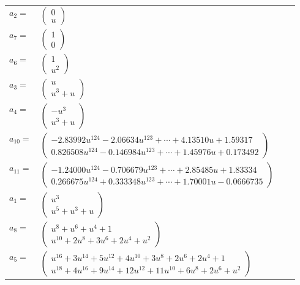 \documentclass[1p]{elsarticle_modified}
\theoremstyle{definition}
\begin{document}
\begin{tabular}{m{7pt} m{180pt} m{7pt} m{180pt} }
\flushright $a_{2}=$&$\begin{pmatrix}0\\u\end{pmatrix}$ \\
\flushright $a_{7}=$&$\begin{pmatrix}1\\0\end{pmatrix}$ \\
\flushright $a_{6}=$&$\begin{pmatrix}1\\u^2\end{pmatrix}$ \\
\flushright $a_{3}=$&$\begin{pmatrix}u\\u^3+u\end{pmatrix}$ \\
\flushright $a_{4}=$&$\begin{pmatrix}- u^3\\u^3+u\end{pmatrix}$ \\
\flushright $a_{10}=$&$\begin{pmatrix}-2.83992 u^{124}-2.06634 u^{123}+\cdots+4.13510 u+1.59317\\0.826508 u^{124}-0.146984 u^{123}+\cdots+1.45976 u+0.173492\end{pmatrix}$ \\
\flushright $a_{11}=$&$\begin{pmatrix}-1.24000 u^{124}-0.706679 u^{123}+\cdots+2.85485 u+1.83334\\0.266675 u^{124}+0.333348 u^{123}+\cdots+1.70001 u-0.0666735\end{pmatrix}$ \\
\flushright $a_{1}=$&$\begin{pmatrix}u^3\\u^5+u^3+u\end{pmatrix}$ \\
\flushright $a_{8}=$&$\begin{pmatrix}u^8+u^6+u^4+1\\u^{10}+2 u^8+3 u^6+2 u^4+u^2\end{pmatrix}$ \\
\flushright $a_{5}=$&$\begin{pmatrix}u^{16}+3 u^{14}+5 u^{12}+4 u^{10}+3 u^8+2 u^6+2 u^4+1\\u^{18}+4 u^{16}+9 u^{14}+12 u^{12}+11 u^{10}+6 u^8+2 u^6+u^2\end{pmatrix}$ \\

\end{tabular}
\end{document}
